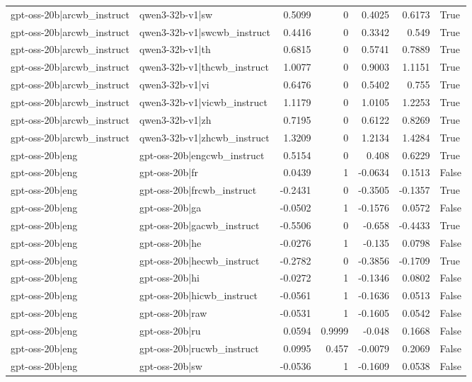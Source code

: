 \begin{table}
\begin{tabular}{l l r r r r l}
gpt-oss-20b|arcwb_instruct & qwen3-32b-v1|sw & 0.5099 & 0 & 0.4025 & 0.6173 & True \\
gpt-oss-20b|arcwb_instruct & qwen3-32b-v1|swcwb_instruct & 0.4416 & 0 & 0.3342 & 0.549 & True \\
gpt-oss-20b|arcwb_instruct & qwen3-32b-v1|th & 0.6815 & 0 & 0.5741 & 0.7889 & True \\
gpt-oss-20b|arcwb_instruct & qwen3-32b-v1|thcwb_instruct & 1.0077 & 0 & 0.9003 & 1.1151 & True \\
gpt-oss-20b|arcwb_instruct & qwen3-32b-v1|vi & 0.6476 & 0 & 0.5402 & 0.755 & True \\
gpt-oss-20b|arcwb_instruct & qwen3-32b-v1|vicwb_instruct & 1.1179 & 0 & 1.0105 & 1.2253 & True \\
gpt-oss-20b|arcwb_instruct & qwen3-32b-v1|zh & 0.7195 & 0 & 0.6122 & 0.8269 & True \\
gpt-oss-20b|arcwb_instruct & qwen3-32b-v1|zhcwb_instruct & 1.3209 & 0 & 1.2134 & 1.4284 & True \\
gpt-oss-20b|eng & gpt-oss-20b|engcwb_instruct & 0.5154 & 0 & 0.408 & 0.6229 & True \\
gpt-oss-20b|eng & gpt-oss-20b|fr & 0.0439 & 1 & -0.0634 & 0.1513 & False \\
gpt-oss-20b|eng & gpt-oss-20b|frcwb_instruct & -0.2431 & 0 & -0.3505 & -0.1357 & True \\
gpt-oss-20b|eng & gpt-oss-20b|ga & -0.0502 & 1 & -0.1576 & 0.0572 & False \\
gpt-oss-20b|eng & gpt-oss-20b|gacwb_instruct & -0.5506 & 0 & -0.658 & -0.4433 & True \\
gpt-oss-20b|eng & gpt-oss-20b|he & -0.0276 & 1 & -0.135 & 0.0798 & False \\
gpt-oss-20b|eng & gpt-oss-20b|hecwb_instruct & -0.2782 & 0 & -0.3856 & -0.1709 & True \\
gpt-oss-20b|eng & gpt-oss-20b|hi & -0.0272 & 1 & -0.1346 & 0.0802 & False \\
gpt-oss-20b|eng & gpt-oss-20b|hicwb_instruct & -0.0561 & 1 & -0.1636 & 0.0513 & False \\
gpt-oss-20b|eng & gpt-oss-20b|raw & -0.0531 & 1 & -0.1605 & 0.0542 & False \\
gpt-oss-20b|eng & gpt-oss-20b|ru & 0.0594 & 0.9999 & -0.048 & 0.1668 & False \\
gpt-oss-20b|eng & gpt-oss-20b|rucwb_instruct & 0.0995 & 0.457 & -0.0079 & 0.2069 & False \\
gpt-oss-20b|eng & gpt-oss-20b|sw & -0.0536 & 1 & -0.1609 & 0.0538 & False \\

\end{tabular}
\end{table}
